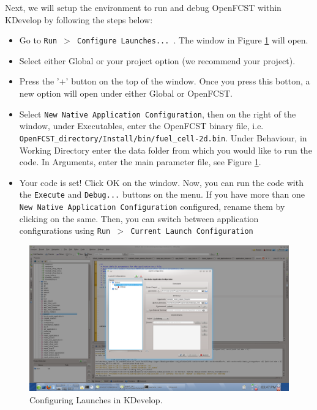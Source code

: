 Next, we will setup the environment to run and debug OpenFCST within KDevelop by following the steps below:
\begin{itemize}
 \item Go to \texttt{Run $>$ Configure Launches... }. The window in Figure \ref{fig:example_KDevelop} will open.
 \item Select either Global or your project option (we recommend your project).
 \item Press the '+' button on the top of the window. Once you press this botton, a new option will open under either Global or OpenFCST. 
 \item Select \texttt{New Native Application Configuration}, then on the right of the window, under Executables, enter the OpenFCST binary file, i.e. \texttt{OpenFCST\_directory/Install/bin/fuel\_cell-2d.bin}. Under Behaviour, in Working Directory enter the data folder from which you would like to run the code. In Arguments, enter the main parameter file, see Figure \ref{fig:example_KDevelop}.
 \item Your code is set! Click OK on the window. Now, you can run the code with the \texttt{Execute} and \texttt{Debug...} buttons on the menu. If you have more than one \texttt{New Native Application Configuration} configured, rename them by clicking on the same. Then, you can switch between application configurations using \texttt{Run $>$ Current Launch Configuration}
\end{itemize}
 
\begin{figure}[btp]
\begin{center} 
\includegraphics[width=\textwidth]{./figures/LaunchConfigurations.png}
\caption{Configuring Launches in KDevelop.}
\label{fig:example_KDevelop}
\end{center}
\end{figure}

